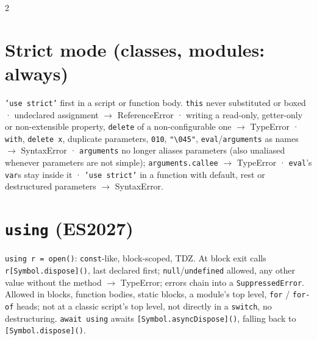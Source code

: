 \documentclass[8pt]{extarticle}
\newcommand\ct[1]{\texttt{#1}}
\begin{document}
\begin{multicols}{2}
\section{Strict mode (classes, modules: always)}
\ct{'use strict'} first in a script or function body. \ct{this} never substituted or boxed ·
undeclared assignment $\rightarrow$ ReferenceError ·
writing a read-only, getter-only or non-extensible property, \ct{delete} of a
non-configurable one $\rightarrow$ TypeError · \ct{with}, \ct{delete x}, duplicate parameters,
\ct{010}, \ct{"\textbackslash 045"}, \ct{eval}/\ct{arguments} as names $\rightarrow$ SyntaxError ·
\ct{arguments} no longer aliases parameters (also unaliased whenever parameters are not
simple); \ct{arguments.callee} $\rightarrow$ TypeError · \ct{eval}'s \ct{var}s stay inside it ·
\ct{'use strict'} in a function with default, rest or destructured parameters $\rightarrow$
SyntaxError.

\section{\texttt{using} (ES2027)}
\ct{using r = open()}: \ct{const}-like, block-scoped, TDZ. At block exit calls
\ct{r[Symbol.dispose]()}, last declared first; \ct{null}/\ct{undefined} allowed, any other value
without the method $\rightarrow$ TypeError; errors chain into a \ct{SuppressedError}. Allowed in
blocks, function bodies, static blocks, a module's top level, \ct{for} / \ct{for-of} heads; not at
a classic script's top level, not directly in a \ct{switch}, no destructuring. \ct{await using}
awaits \ct{[Symbol.asyncDispose]()}, falling back to \ct{[Symbol.dispose]()}.

\end{multicols}

\end{document}
